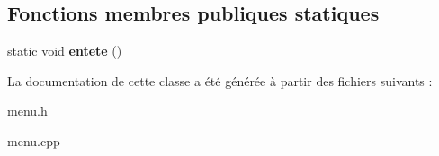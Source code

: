 \subsection*{Fonctions membres publiques statiques}
\begin{DoxyCompactItemize}
\item 
static void {\bfseries entete} ()\hypertarget{classMenu_a7f575e5c439d03cef1e1a5a79a66aa54}{}\label{classMenu_a7f575e5c439d03cef1e1a5a79a66aa54}

\end{DoxyCompactItemize}


La documentation de cette classe a été générée à partir des fichiers suivants \+:\begin{DoxyCompactItemize}
\item 
menu.\+h\item 
menu.\+cpp\end{DoxyCompactItemize}
